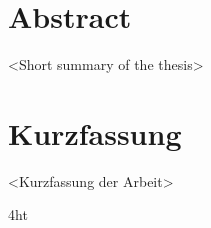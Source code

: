 

\Titelblatt

\pagestyle{preamble}
\renewcommand*{\chapterpagestyle}{preamble}



\section*{Abstract}

<Short summary of the thesis>

\cleardoublepage

\section*{Kurzfassung}

<Kurzfassung der Arbeit>

\cleardoublepage



\iftex4ht
\else
\fi

%
%

%
%
%
\tableofcontents


\listoffigures
\listoftables

\ifdeutsch
\else
\fi

